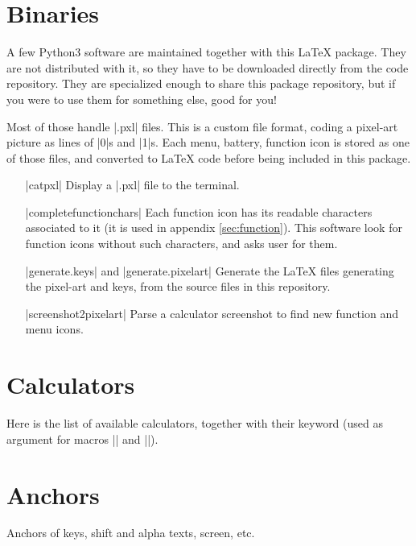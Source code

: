 \documentclass{ltxdoc}
\begin{document}
 \section{Binaries}
 \label{sec:binaries}

 A few Python3 software are maintained together with this \LaTeX{} package. They are not distributed with it, so they have to be downloaded directly from the code repository. They are specialized enough to share this package repository, but if you were to use them for something else, good for you!

 Most of those handle |.pxl| files. This is a custom file format, coding a pixel-art picture as lines of |0|s and |1|s. Each menu, battery, function icon is stored as one of those files, and converted to \LaTeX{} code before being included in this package.

 \begin{itemize}
 \item[|catpxl|] Display a |.pxl| file to the terminal.
 \item[|completefunctionchars|] Each function icon has its readable characters associated to it (it is used in appendix \ref{sec:function}). This software look for function icons without such characters, and asks user for them.
 \item[|generate.keys| and |generate.pixelart|] Generate the \LaTeX{} files generating the pixel-art and keys, from the source files in this repository.
 \item[|screenshot2pixelart|] Parse a calculator screenshot to find new function and menu icons.
 \end{itemize}

 \appendix

 \section{Calculators}
 \label{sec:calculators}

 Here is the list of available calculators, together with their keyword (used as argument for macros |\calculator| and |\tikzcalculator|).

 

 \section{Anchors}
 \label{sec:anchors}

 Anchors of keys, shift and alpha texts, screen, etc.
\end{document}
